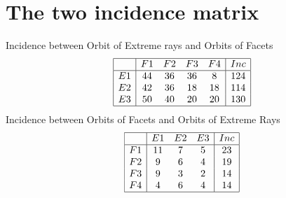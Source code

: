 \documentclass[12pt]{article}
\begin{document}
\section{The two incidence matrix}
Incidence between Orbit of Extreme rays and Orbits of Facets
\begin{equation*}
\begin{array}{|c|cccc|c|}
\hline
&F1&F2&F3&F4&Inc\\
\hline
E1&44&36&36&8&124\\
E2&42&36&18&18&114\\
E3&50&40&20&20&130\\
\hline
\end{array}
\end{equation*}
Incidence between Orbits of Facets and Orbits of Extreme Rays
\begin{equation*}
\begin{array}{|c|ccc|c|}
\hline
&E1&E2&E3&Inc\\
\hline
F1&11&7&5&23\\
F2&9&6&4&19\\
F3&9&3&2&14\\
F4&4&6&4&14\\
\hline
\end{array}
\end{equation*}
\end{document}
